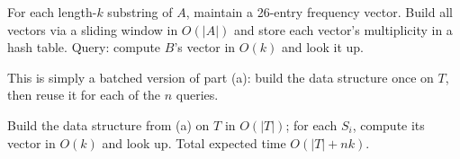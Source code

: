 \documentclass[12pt,twoside]{article}
\begin{document}
\begin{problems}
\begin{problemparts}
For each length-$k$ substring of $A$, maintain a 26-entry frequency vector. Build all vectors via a sliding window in $O(|A|)$ and store each vector's multiplicity in a hash table. Query: compute $B$'s vector in $O(k)$ and look it up.
 
\problempart %
This is simply a batched version of part (a): build the data structure once on $T$, then reuse it for each of the $n$ queries.
 
Build the data structure from (a) on $T$ in $O(|T|)$; for each $S_i$, compute its vector in $O(k)$ and look up. Total expected time $O(|T| + nk)$.
 
\end{problemparts}

\end{problems}
\end{document}
